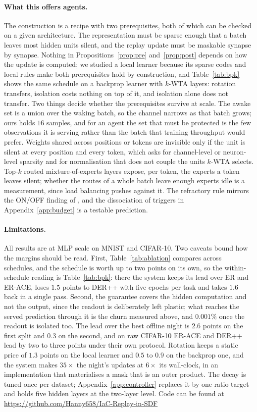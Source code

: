 \documentclass{article}
\newcommand{\kwta}{$k$-WTA}
\begin{document}
\paragraph{What this offers agents.} The construction is a recipe with two prerequisites,
both of which can be checked on a given architecture. The representation must be sparse
enough that a batch leaves most hidden units silent, and the replay update must be maskable
synapse by synapse. Nothing in Propositions~\ref{prop:pre} and~\ref{prop:post} depends on how
the update is computed; we studied a local learner because its sparse codes and local rules
make both prerequisites hold by construction, and Table~\ref{tab:bpk} shows the same
schedule on a backprop learner with \kwta{} layers: rotation transfers, isolation costs
nothing on top of it, and isolation alone does not transfer. Two things decide whether the
prerequisites survive at scale. The awake set is a union over the waking batch, so the
channel narrows as that batch grows; ours holds $16$ samples, and for an agent the set that
must be protected is the few observations it is serving rather than the batch that training
throughput would prefer. Weights shared across positions or tokens are invisible only if the
unit is silent at every position and every token, which asks for channel-level or
neuron-level sparsity and for normalisation that does not couple the units \kwta{} selects.
Top-$k$ routed mixture-of-experts layers expose, per token, the experts a token leaves
silent; whether the routes of a whole batch leave enough experts idle is a measurement, since
load balancing pushes against it. The refractory rule mirrors the ON/OFF finding of
\citet{driessen2026}, and the dissociation of triggers in Appendix~\ref{app:budget} is a
testable prediction.

\paragraph{Limitations.} All results are at MLP scale on MNIST and CIFAR-10. Two caveats
bound how the margins should be read. First, Table~\ref{tab:ablation} compares across schedules, and the
schedule is worth up to two points on its own, so the within-schedule reading is
Table~\ref{tab:bpk}: there the system keeps its lead over ER and ER-ACE, loses $1.5$ points
to DER++ with five epochs per task and takes $1.6$ back in a single pass. Second, the
guarantee covers the hidden computation and not the output, since the readout is
deliberately left plastic; what reaches the served prediction through it is the churn
measured above, and $0.001\%$ once the readout is isolated too. The lead over the best
offline night is $2.6$ points on the first split and $0.3$ on the second, and on raw
CIFAR-10 ER-ACE and DER++ lead by two to three points under their own protocol. Rotation
keeps a static price of $1.3$ points on the local learner and $0.5$ to $0.9$ on the backprop
one, and the system makes $35\times$ the night's updates at $6\times$ its wall-clock, in an
implementation that materialises a mask that is an outer product.
The decay is tuned once per dataset; Appendix~\ref{app:controller} replaces it by one ratio
target and holds five hidden layers at the two-layer level. Code can be found at
\url{https://github.com/Hanny658/IaC-Replay-in-SDF}
\end{document}
